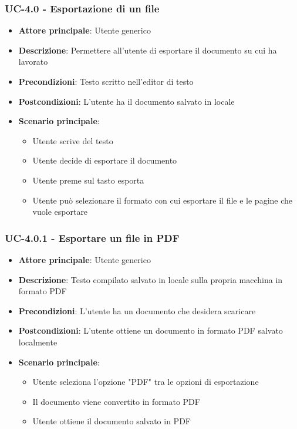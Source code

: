 \documentclass[11pt,a4paper]{article}
\begin{document}
\subsubsection{UC-4.0 - Esportazione di un file}
\begin{itemize}
    \item \textbf{Attore principale}: Utente generico
    \item \textbf{Descrizione}: Permettere all'utente di esportare il documento su cui ha lavorato
    \item \textbf{Precondizioni}: Testo scritto nell'editor di testo
    \item \textbf{Postcondizioni}: L'utente ha il documento salvato in locale
    \item \textbf{Scenario principale}:
        \begin{itemize}
            \item Utente scrive del testo
            \item Utente decide di esportare il documento
            \item Utente preme sul tasto esporta
            \item Utente può selezionare il formato con cui esportare il file e le pagine che vuole esportare
        \end{itemize}
\end{itemize}

\subsubsection{UC-4.0.1 - Esportare un file in PDF}
\begin{itemize}
    \item \textbf{Attore principale}: Utente generico
    \item \textbf{Descrizione}: Testo compilato salvato in locale sulla propria macchina in formato PDF
    \item \textbf{Precondizioni}: L'utente ha un documento che desidera scaricare
    \item \textbf{Postcondizioni}: L'utente ottiene un documento in formato PDF salvato localmente
    \item \textbf{Scenario principale}:
        \begin{itemize}
            \item Utente seleziona l'opzione "PDF" tra le opzioni di esportazione
            \item Il documento viene convertito in formato PDF
            \item Utente ottiene il documento salvato in PDF
        \end{itemize}
\end{itemize}
\end{document}
